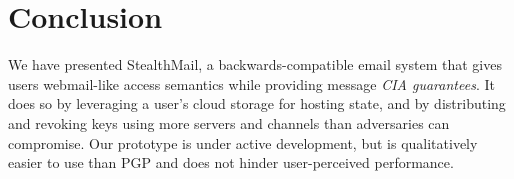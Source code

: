 \section{Conclusion}
\label{sec:conclusion}

We have presented StealthMail, a backwards-compatible email system that gives users 
webmail-like access semantics while providing message \emph{CIA guarantees}.  It does so
by leveraging a user's cloud storage for hosting state, and by distributing and revoking
keys using more servers and channels than adversaries can compromise.  Our prototype
is under active development, but is qualitatively easier to use than PGP and does 
not hinder user-perceived performance.
